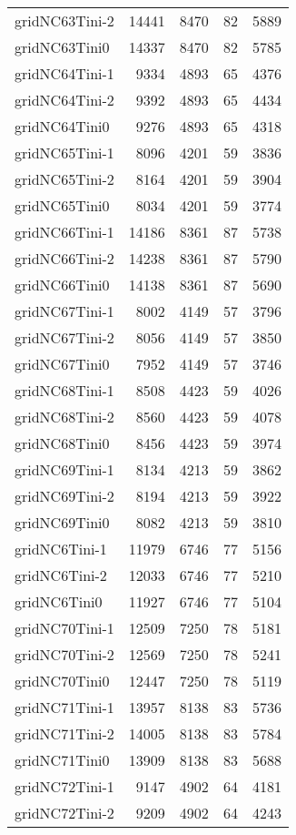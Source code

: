\documentclass[../../../thesis.tex]{subfiles}
\begin{document}
\begin{longtable}{lrrrr}
gridNC63Tini-2 & 14441 & 8470 & 82 & 5889 \\
gridNC63Tini0 & 14337 & 8470 & 82 & 5785 \\
gridNC64Tini-1 & 9334 & 4893 & 65 & 4376 \\
gridNC64Tini-2 & 9392 & 4893 & 65 & 4434 \\
gridNC64Tini0 & 9276 & 4893 & 65 & 4318 \\
gridNC65Tini-1 & 8096 & 4201 & 59 & 3836 \\
gridNC65Tini-2 & 8164 & 4201 & 59 & 3904 \\
gridNC65Tini0 & 8034 & 4201 & 59 & 3774 \\
gridNC66Tini-1 & 14186 & 8361 & 87 & 5738 \\
gridNC66Tini-2 & 14238 & 8361 & 87 & 5790 \\
gridNC66Tini0 & 14138 & 8361 & 87 & 5690 \\
gridNC67Tini-1 & 8002 & 4149 & 57 & 3796 \\
gridNC67Tini-2 & 8056 & 4149 & 57 & 3850 \\
gridNC67Tini0 & 7952 & 4149 & 57 & 3746 \\
gridNC68Tini-1 & 8508 & 4423 & 59 & 4026 \\
gridNC68Tini-2 & 8560 & 4423 & 59 & 4078 \\
gridNC68Tini0 & 8456 & 4423 & 59 & 3974 \\
gridNC69Tini-1 & 8134 & 4213 & 59 & 3862 \\
gridNC69Tini-2 & 8194 & 4213 & 59 & 3922 \\
gridNC69Tini0 & 8082 & 4213 & 59 & 3810 \\
gridNC6Tini-1 & 11979 & 6746 & 77 & 5156 \\
gridNC6Tini-2 & 12033 & 6746 & 77 & 5210 \\
gridNC6Tini0 & 11927 & 6746 & 77 & 5104 \\
gridNC70Tini-1 & 12509 & 7250 & 78 & 5181 \\
gridNC70Tini-2 & 12569 & 7250 & 78 & 5241 \\
gridNC70Tini0 & 12447 & 7250 & 78 & 5119 \\
gridNC71Tini-1 & 13957 & 8138 & 83 & 5736 \\
gridNC71Tini-2 & 14005 & 8138 & 83 & 5784 \\
gridNC71Tini0 & 13909 & 8138 & 83 & 5688 \\
gridNC72Tini-1 & 9147 & 4902 & 64 & 4181 \\
gridNC72Tini-2 & 9209 & 4902 & 64 & 4243 \\

\end{longtable}
\end{document}
